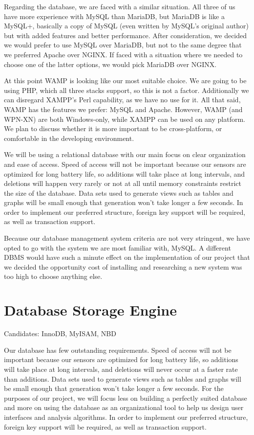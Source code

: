 \documentclass[letterpaper,10pt,titlepage]{article}
\begin{document}
Regarding the database, we are faced with a similar situation. All three of us have more experience with MySQL than MariaDB, but MariaDB is like a MySQL+, basically a copy of MySQL (even written by MySQL’s original author) but with added features and better performance. After consideration, we decided we would prefer to use MySQL over MariaDB, but not to the same degree that we preferred Apache over NGINX. If faced with a situation where we needed to choose one of the latter options, we would pick MariaDB over NGINX. 

At this point WAMP is looking like our most suitable choice. We are going to be using PHP, which all three stacks support, so this is not a factor. Additionally we can disregard XAMPP’s Perl capability, as we have no use for it. All that said, WAMP has the features we prefer: MySQL and Apache. However, WAMP (and WPN-XN) are both Windows-only, while XAMPP can be used on any platform. We plan to discuss whether it is more important to be cross-platform, or comfortable in the developing environment. 

We will be using a relational database with our main focus on clear organization and ease of access. Speed of access will not be important because our sensors are optimized for long battery life, so additions will take place at long intervals, and deletions will happen very rarely or not at all until memory constraints restrict the size of the database. Data sets used to generate views such as tables and graphs will be small enough that generation won’t take longer a few seconds. In order to implement our preferred structure, foreign key support will be required, as well as transaction support.

Because our database management system criteria are not very stringent, we have opted to go with the system we are most familiar with, MySQL. A different DBMS would have such a minute effect on the implementation of our project that we decided the opportunity cost of installing and researching a new system was too high to choose anything else. 

\section{Database Storage Engine}

Candidates: InnoDB, MyISAM, NBD

Our database has few outstanding requirements. Speed of access will not be important because our sensors are optimized for long battery life, so additions will take place at long intervals, and deletions will never occur at a faster rate than additions. Data sets used to generate views such as tables and graphs will be small enough that generation won’t take longer a few seconds. For the purposes of our project, we will focus less on building a perfectly suited database and more on using the database as an organizational tool to help us design user interfaces and analysis algorithms. In order to implement our preferred structure, foreign key support will be required, as well as transaction support.
\end{document}
